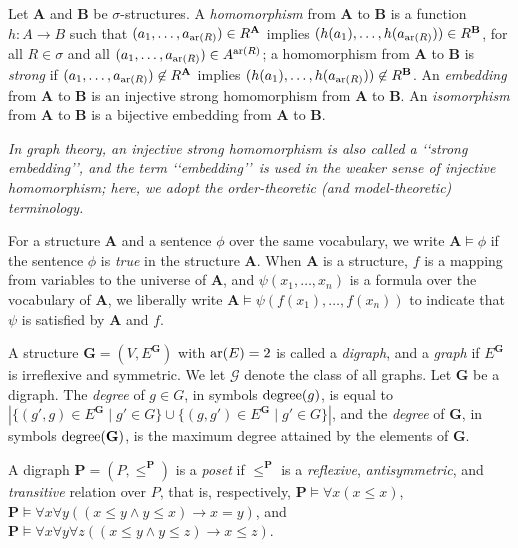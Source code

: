 \documentclass[usletter]{article}
\newcommand{\rela}{\mathbf{A}}
\newcommand{\pp}{\mathbf{P}}
\begin{document}
Let $\mathbf{A}$ and $\mathbf{B}$ be $\sigma$-structures.  
A \emph{homomorphism} from $\mathbf{A}$ to $\mathbf{B}$ 
is a function $h \colon A \to B$ such that $(a_1,\ldots,a_{\textup{ar}(R)}) \in R^{\mathbf{A}}$ 
implies $(h(a_1),\ldots,h(a_{\textup{ar}(R)})) \in R^{\mathbf{B}}$, 
for all $R \in \sigma$ and all $(a_1,\ldots,a_{\textup{ar}(R)}) \in A^{\textup{ar}(R)}$; 
a homomorphism from $\mathbf{A}$ to $\mathbf{B}$ is \emph{strong} 
if $(a_1,\ldots,a_{\textup{ar}(R)}) \not\in R^{\mathbf{A}}$ 
implies $(h(a_1),\ldots,h(a_{\textup{ar}(R)})) \not\in R^{\mathbf{B}}$.  
An \emph{embedding} from $\mathbf{A}$ to $\mathbf{B}$ 
is an injective strong homomorphism from $\mathbf{A}$ to $\mathbf{B}$.  
An \emph{isomorphism} from $\mathbf{A}$ to $\mathbf{B}$ 
is a bijective embedding from $\mathbf{A}$ to $\mathbf{B}$.  

\emph{In graph theory, an injective strong homomorphism is also called a \lq\lq strong embedding\rq\rq,  
and the term \lq\lq embedding\rq\rq\ is used in the weaker sense of injective homomorphism; here, 
we adopt the order-theoretic (and model-theoretic) terminology.} 

For a structure $\rela$ and a sentence $\phi$ over the same vocabulary, 
we write $\rela \models \phi$ if the sentence $\phi$ is \emph{true} in the structure $\rela$.  
When $\rela$ is a structure, $f$ is a mapping from variables to 
the universe of $\rela$, and $\psi(x_1,\ldots,x_n)$ is a formula over the vocabulary of $\rela$,
we liberally write $\rela \models \psi(f(x_1),\ldots,f(x_n))$ to indicate that $\psi$ is satisfied 
by $\rela$ and $f$.  




A structure $\mathbf{G}=(V,E^\mathbf{G})$ 
with $\textup{ar}(E)=2$ is called a \emph{digraph}, 
and a \emph{graph} if $E^\mathbf{G}$ is irreflexive and symmetric.  We let $\mathcal{G}$ 
denote the class of all graphs. Let $\mathbf{G}$ be a digraph.  The \emph{degree} of $g \in G$, in symbols $\textup{degree}(g)$,  
is equal to $|\{ (g',g) \in E^\mathbf{G} \mid g' \in G \} 
\cup \{ (g,g') \in E^\mathbf{G} \mid g' \in G \}|$, 
and the \emph{degree} of $\mathbf{G}$, in symbols $\textup{degree}(\mathbf{G})$, 
is the maximum degree attained by the elements of $\mathbf{G}$.  

A digraph $\pp=(P,\leq^\pp)$ 
is a \emph{poset} if $\leq^\pp$ is a \emph{reflexive}, 
\emph{antisymmetric}, and \emph{transitive} relation over $P$, 
that is, respectively, $\pp \models \forall x(x \leq x)$, 
$\pp \models \forall x \forall y((x \leq y \wedge y \leq x) \to x=y)$, 
and $\pp \models \forall x \forall y \forall z((x \leq y \wedge y \leq z) \to x \leq z)$.  
\end{document}
